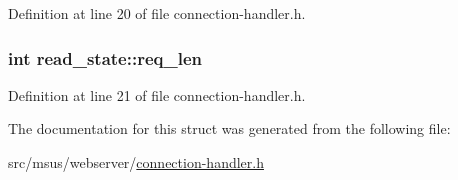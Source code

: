 Definition at line 20 of file connection-\/handler.\-h.

\hypertarget{structread__state_a5629ae045b84454938394c8af94124d1}{
\subsubsection[{req\-\_\-len}]{\setlength{\rightskip}{0pt plus 5cm}int read\-\_\-state\-::req\-\_\-len}}\label{structread__state_a5629ae045b84454938394c8af94124d1}


Definition at line 21 of file connection-\/handler.\-h.



The documentation for this struct was generated from the following file\-:\begin{DoxyCompactItemize}
\item 
src/msus/webserver/\hyperlink{connection-handler_8h}{connection-\/handler.\-h}\end{DoxyCompactItemize}
